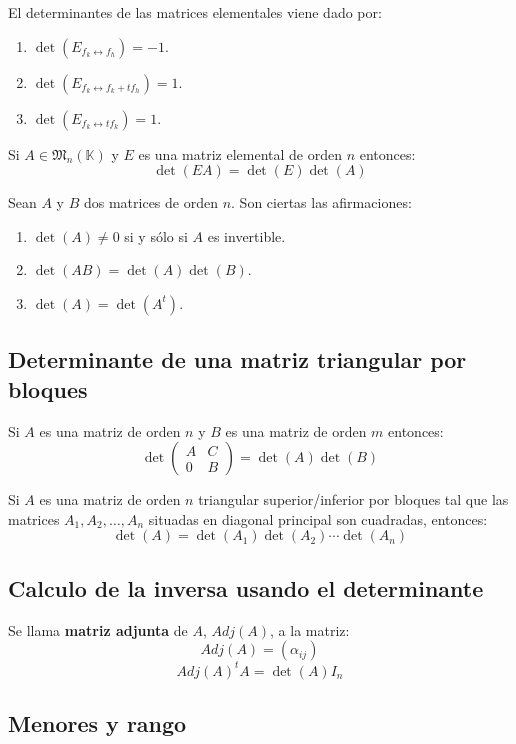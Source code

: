 El determinantes de las matrices elementales viene dado por:
\begin{enumerate}
\item $\det(E_{f_k \leftrightarrow f_h}) = -1$.
\item $\det(E_{f_k \leftrightarrow f_k + t f_h}) = 1$.
\item $\det(E_{f_k \leftrightarrow t f_k}) = 1$.
\end{enumerate}

Si $A \in \mathfrak{M}_n(\mathbb{K})$ y $E$ es una matriz elemental de orden $n$ entonces:
\[
\det(EA)=\det(E)\det(A)
\]

Sean $A$ y $B$ dos matrices de orden $n$. Son ciertas las afirmaciones:
\begin{enumerate}
\item $\det(A) \neq 0$ si y sólo si $A$ es invertible.
\item $\det(AB) = \det(A)\det(B)$.
\item $\det(A)= \det(A^t)$.
\end{enumerate}

\subsection{Determinante de una matriz triangular por bloques}

Si $A$ es una matriz de orden $n$ y $B$ es una matriz de orden $m$ entonces:
\[
\det\begin{pmatrix}
A & C \\
0 & B
\end{pmatrix} = \det(A) \det(B)
\]

Si $A$ es una matriz de orden $n$ triangular superior/inferior por bloques tal que las matrices $A_1,A_2,\ldots,A_n$ situadas en diagonal principal son cuadradas, entonces:
\[
\det(A)=\det(A_1)\det(A_2)\cdots\det(A_n)
\]

\subsection{Calculo de la inversa usando el determinante}

Se llama \textbf{matriz adjunta} de $A$, $Adj(A)$, a la matriz:
\[
Adj(A)=(\alpha_{ij})
\]
\[
Adj(A)^t A = \det(A) I_n
\]

\subsection{Menores y rango}


